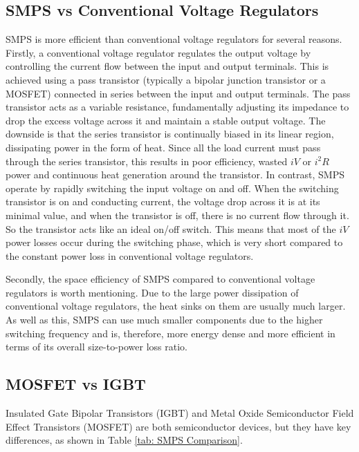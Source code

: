     \subsection{SMPS vs Conventional Voltage Regulators}
        SMPS is more efficient than conventional voltage regulators for several reasons. 
        Firstly, a conventional voltage regulator regulates the output voltage by controlling the current flow between the input and output terminals. This is achieved using a pass transistor (typically a bipolar junction transistor or a MOSFET) connected in series between the input and output terminals. The pass transistor acts as a variable resistance, fundamentally adjusting its impedance to drop the excess voltage across it and maintain a stable output voltage. The downside is that the series transistor is continually biased in its linear region, dissipating power in the form of heat. Since all the load current must pass through the series transistor, this results in poor efficiency, wasted \(iV\) or \(i^2R\) power and continuous heat generation around the transistor. In contrast, SMPS operate by rapidly switching the input voltage on and off. When the switching transistor is on and conducting current, the voltage drop across it is at its minimal value, and when the transistor is off, there is no current flow through it. So the transistor acts like an ideal on/off switch. This means that most of the \(iV\) power losses occur during the switching phase, which is very short compared to the constant power loss in conventional voltage regulators.
        
        Secondly, the space efficiency of SMPS compared to conventional voltage regulators is worth mentioning. Due to the large power dissipation of conventional voltage regulators, the heat sinks on them are usually much larger. As well as this, SMPS can use much smaller components due to the higher switching frequency and is, therefore, more energy dense and more efficient in terms of its overall size-to-power loss ratio.

    \subsection{MOSFET vs IGBT}
        Insulated Gate Bipolar Transistors (IGBT) and Metal Oxide Semiconductor Field Effect Transistors (MOSFET) are both semiconductor devices, but they have key differences, as shown in Table \ref{tab: SMPS Comparison}.
        

